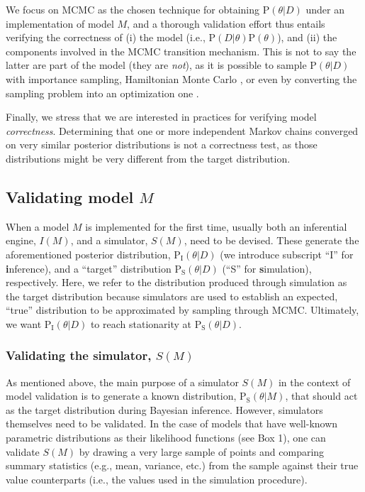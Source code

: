 \documentclass[oneside]{article}
\begin{document}
We focus on MCMC as the chosen technique for obtaining $\text{P}(\theta|D)$
under an implementation of model $M$,
and a thorough validation effort thus entails verifying the
correctness of (i) the model (i.e., $\text{P}(D|\theta)\text{P}(\theta)$), and (ii)
the components involved in the MCMC transition mechanism.
This is not to say the latter are part of the model (they are
\emph{not}), as it is possible to sample $\text{P}(\theta|D)$ with importance sampling, Hamiltonian
Monte Carlo \citep{hmc}, or even by converting the sampling problem into an
optimization one \citep{zhang18}.

Finally, we stress that we are interested in practices for verifying model
\emph{correctness}.
Determining that one or more independent Markov chains converged on very
similar posterior distributions is not a correctness test, as those
distributions might be very different from the target distribution.

\subsection*{Validating model $M$}

When a model $M$ is implemented for the first time, usually both an
inferential engine, $I(M)$, and a simulator, $S(M)$, need to be devised.
These generate the aforementioned posterior distribution,
$\text{P}_{\text{I}}(\theta|D)$ (we introduce subscript ``I'' for
\textbf{i}nference), and a ``target'' distribution $\text{P}_{\text{S}}(\theta|D)$ (``S''
for \textbf{s}imulation), respectively.
Here, we refer to the distribution produced through simulation as the
target distribution because simulators are used to establish an
expected, ``true'' distribution to be approximated by sampling through MCMC.
Ultimately, we want $\text{P}_{\text{I}}(\theta|D)$ to reach stationarity at
$\text{P}_{\text{S}}(\theta|D)$.

\subsubsection*{Validating the simulator, $S(M)$}\label{verify-correctness-of-simulator-implementation}

As mentioned above, the main purpose of a simulator $S(M)$ in the context of model
validation is to generate a known distribution,
$\text{P}_{\text{S}}(\theta|M)$, that should act as the target distribution during
Bayesian inference.
However, simulators themselves need to be validated.
In the case of models that have well-known parametric distributions as their
likelihood functions (see Box 1), one can validate $S(M)$ by
drawing a very large sample of points and comparing summary statistics
(e.g., mean, variance, etc.) from the sample against their true value counterparts (i.e., the
values used in the simulation procedure). 
\end{document}
